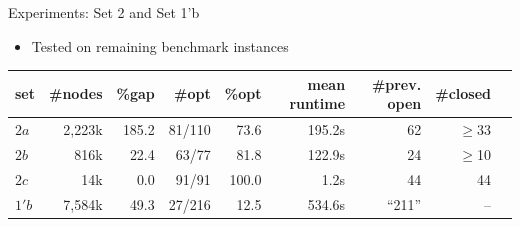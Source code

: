 \documentclass{beamer}
\begin{document}
\begin{frame}{Experiments: Set 2 and Set 1'b}
	\begin{itemize}
		\item Tested on remaining benchmark instances\pause
	\end{itemize}
	\begin{table}[ptb]
		\begin{adjustwidth}{-.3in}{-.3in}
		\setlength{\tabcolsep}{5pt}
		\small
		\begin{tabular}{lrrrrrrrr}
			\toprule
			set & \#nodes & \%gap & \#opt & \%opt & mean runtime & {\color{red} \#prev. open} & {\color{red} \#closed} \\
			\midrule\midrule
			$2a$ & 2,223k & 185.2 & 81/110 & 73.6 & 195.2s & {\color{red} 62} & {\color{red} $\geq$33 } \\\pause
			$2b$ & 816k & 22.4 & 63/77 & 81.8 & 122.9s & {\color{red} 24} & {\color{red} $\geq$10 } \\\pause
			$2c$ & 14k & 0.0 & 91/91 & 100.0 & 1.2s & {\color{red} 44} & {\color{red} 44 } \\\midrule\pause
			$1'b$ & 7,584k & 49.3 & 27/216 & 12.5 & 534.6s & {\color{red} ``211''} & {\color{red} --} \\
			\bottomrule
		\end{tabular}
		\label{tab:benchmarks}
		\end{adjustwidth}
	\end{table}
\end{frame}
\end{document}
